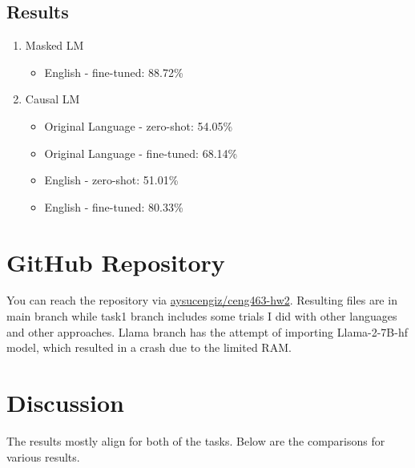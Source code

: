\documentclass[
]{ceurart}
\begin{document}
\subsection{Results}
\begin{enumerate}
    \item Masked LM
    \begin{itemize}
        \item English - fine-tuned: 88.72\%
    \end{itemize}
    \item Causal LM
    \begin{itemize}
        \item Original Language - zero-shot: 54.05\%
        \item Original Language - fine-tuned:  68.14\%
        \item English - zero-shot: 51.01\%
        \item English - fine-tuned: 80.33\%
    \end{itemize}
\end{enumerate}


\section{GitHub Repository}
You can reach the repository via \href{https://github.com/aysucengiz/ceng463-hw2.git}{aysucengiz/ceng463-hw2}. Resulting files are in main branch while task1 branch includes some trials I did with other languages and other approaches. Llama branch has the attempt of importing Llama-2-7B-hf model, which resulted in a crash due to the limited RAM.


\section{Discussion}

The results mostly align for both of the tasks. Below are the comparisons for various results.
\end{document}
